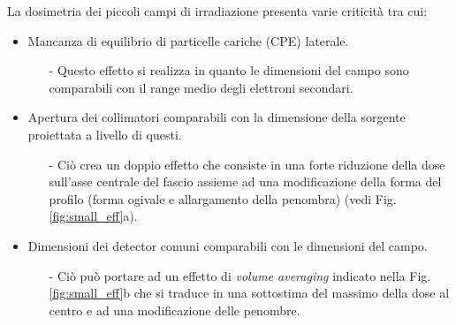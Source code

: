 La dosimetria dei piccoli campi di irradiazione presenta varie criticità \cite{Das2008} tra cui:
\begin{itemize}
\item Mancanza di equilibrio di particelle cariche (CPE) laterale.
\begin{itemize}
\item[-] Questo effetto si realizza in quanto le dimensioni del campo sono comparabili con il range medio degli elettroni secondari.
\end{itemize}
\item Apertura dei collimatori comparabili con la dimensione della sorgente proiettata a livello di questi.
\begin{itemize}
\item[-] Ciò crea un doppio effetto che consiste in una forte riduzione della dose sull'asse centrale del fascio assieme ad una modificazione della forma del profilo (forma ogivale e allargamento della penombra) (vedi Fig.\ref{fig:small_eff}a).
\end{itemize}
\item Dimensioni dei detector comuni comparabili con le dimensioni del campo.
\begin{itemize}
\item[-] Ciò può portare ad un effetto di \textit{volume averaging} indicato nella Fig.\ref{fig:small_eff}b che si traduce in una sottostima del massimo della dose al centro e ad una modificazione delle penombre.
\end{itemize}
\end{itemize}
